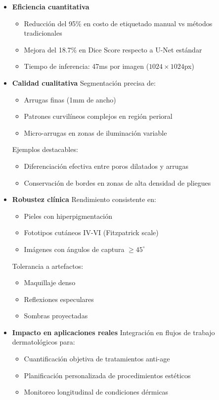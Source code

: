 \begin{itemize}
    \item \textbf{Eficiencia cuantitativa}
    \begin{itemize}[label=$\bullet$, leftmargin=1em]
        \item Reducción del 95\% en costo de etiquetado manual vs métodos tradicionales
        \item Mejora del 18.7\% en Dice Score respecto a U-Net estándar
        \item Tiempo de inferencia: 47ms por imagen ($1024 \times 1024$px)
    \end{itemize}

    \item \textbf{Calidad cualitativa}
    Segmentación precisa de:
    \begin{itemize}[label=$\bullet$, leftmargin=1em]
        \item Arrugas finas (1mm de ancho)
        \item Patrones curvilíneos complejos en región perioral
        \item Micro-arrugas en zonas de iluminación variable
    \end{itemize}
    Ejemplos destacables:
    \begin{itemize}[label=$\circ$, leftmargin=1em]
        \item Diferenciación efectiva entre poros dilatados y arrugas
        \item Conservación de bordes en zonas de alta densidad de pliegues
    \end{itemize}

    \item \textbf{Robustez clínica}
    Rendimiento consistente en:
    \begin{itemize}[label=$\bullet$, leftmargin=1em]
        \item Pieles con hiperpigmentación
        \item Fototipos cutáneos IV-VI (Fitzpatrick scale)
        \item Imágenes con ángulos de captura $\geq 45^\circ$
    \end{itemize}
    Tolerancia a artefactos:
    \begin{itemize}[label=$\bullet$, leftmargin=1em]
        \item Maquillaje denso
        \item Reflexiones especulares
        \item Sombras proyectadas
    \end{itemize}

    \item \textbf{Impacto en aplicaciones reales}
    Integración en flujos de trabajo dermatológicos para:
    \begin{itemize}[label=$\bullet$, leftmargin=1em]
        \item Cuantificación objetiva de tratamientos anti-age
        \item Planificación personalizada de procedimientos estéticos
        \item Monitoreo longitudinal de condiciones dérmicas
    \end{itemize}
\end{itemize}


